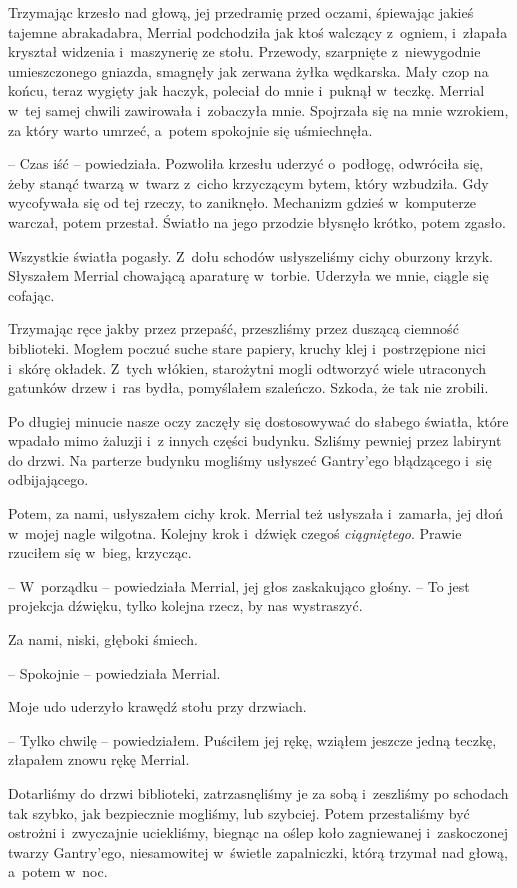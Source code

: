 \documentclass[oneside,polish,11pt,sfheadings]{mwbk}
\begin{document}
Trzymając krzesło nad głową, jej przedramię przed oczami, śpiewając
jakieś tajemne abrakadabra, Merrial podchodziła jak ktoś walczący z~ogniem, i~złapała kryształ widzenia i~maszynerię ze stołu. Przewody,
szarpnięte z~niewygodnie umieszczonego gniazda, smagnęły jak zerwana
żyłka wędkarska. Mały czop na końcu, teraz wygięty jak haczyk, poleciał
do mnie i~puknął w~teczkę. Merrial w~tej samej chwili zawirowała i~zobaczyła mnie. Spojrzała się na mnie wzrokiem, za który warto umrzeć, a~potem spokojnie się uśmiechnęła.

-- Czas iść -- powiedziała. Pozwoliła krzesłu uderzyć o~podłogę, odwróciła
się, żeby stanąć twarzą w~twarz z~cicho krzyczącym bytem, który
wzbudziła. Gdy wycofywała się od tej rzeczy, to zaniknęło. Mechanizm
gdzieś w~komputerze warczał, potem przestał. Światło na jego przodzie
błysnęło krótko, potem zgasło.

Wszystkie światła pogasły. Z~dołu schodów usłyszeliśmy cichy oburzony
krzyk. Słyszałem Merrial chowającą aparaturę w~torbie. Uderzyła we mnie,
ciągle się cofając.

Trzymając ręce jakby przez przepaść, przeszliśmy przez duszącą ciemność
biblioteki. Mogłem poczuć suche stare papiery, kruchy klej i~postrzępione nici i~skórę okładek. Z~tych włókien, starożytni mogli
odtworzyć wiele utraconych gatunków drzew i~ras bydła, pomyślałem
szaleńczo. Szkoda, że tak nie zrobili.

Po długiej minucie nasze oczy zaczęły się dostosowywać do słabego
światła, które wpadało mimo żaluzji i~z innych części budynku. Szliśmy
pewniej przez labirynt do drzwi. Na parterze budynku mogliśmy usłyszeć
Gantry'ego błądzącego i~się odbijającego.

Potem, za nami, usłyszałem cichy krok. Merrial też usłyszała i~zamarła,
jej dłoń w~mojej nagle wilgotna. Kolejny krok i~dźwięk czegoś
\textit{ciągniętego}. Prawie rzuciłem się w~bieg, krzycząc.

-- W~porządku -- powiedziała Merrial, jej głos zaskakująco głośny. -- To
jest projekcja dźwięku, tylko kolejna rzecz, by nas wystraszyć.

Za nami, niski, głęboki śmiech.

-- Spokojnie -- powiedziała Merrial.

Moje udo uderzyło krawędź stołu przy drzwiach. 

-- Tylko chwilę -- powiedziałem. Puściłem jej rękę, wziąłem jeszcze jedną teczkę, złapałem
znowu rękę Merrial.

Dotarliśmy do drzwi biblioteki, zatrzasnęliśmy je za sobą i~zeszliśmy po
schodach tak szybko, jak bezpiecznie mogliśmy, lub szybciej. Potem
przestaliśmy być ostrożni i~zwyczajnie uciekliśmy, biegnąc na oślep koło
zagniewanej i~zaskoczonej twarzy Gantry'ego, niesamowitej w~świetle
zapalniczki, którą trzymał nad głową, a~potem w~noc.
\end{document}
